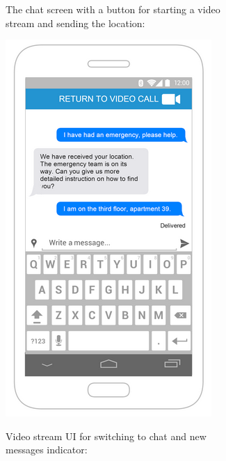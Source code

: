 \documentclass{article}
\begin{document}
\begin{figure}
\begin{subfigure}{.5\textwidth}
		The chat screen with a button for starting a video stream and sending the location:
\end{subfigure}%
\begin{subfigure}{.5\textwidth}
  \centering
  \includegraphics[width=.9\linewidth]{"Chat/10"}
	
	Video stream UI for switching to chat and new messages indicator:
\end{subfigure}
\end{figure}\clearpage
\end{document}

